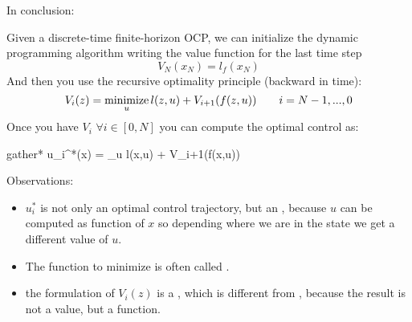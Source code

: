 In conclusion:

Given a discrete-time finite-horizon OCP, we can initialize the dynamic programming algorithm writing the value function for the last time step
\[V_N(x_N) = l_f(x_N)\]
And then you use the recursive optimality principle (backward in time):
\[V_i(z) = \operatorname*{minimize}_{u} l(z, u) + V_{i+1}(f(z,u))\qquad i = N-1,...,0\]
Once you have $V_i \,\,\forall i \in [0, N]$ you can compute the optimal control as:
\begin{empheq}[box=%
	\fbox]{gather*}
		u_i^*(x) = \argmin_u  l(x,u) + V_{i+1}(f(x,u))
	\end{empheq}



Observations:
\begin{itemize}
\item $u_i^*$ is not only an optimal control trajectory, but an , because $u$ can be computed as function of $x$ so depending where we are in the state we get a different value of $u$.
\item The function to minimize is often called .
\item the formulation of $V_i(z)$ is a , which is different from , because the result is not a value, but a function.
\end{itemize}


